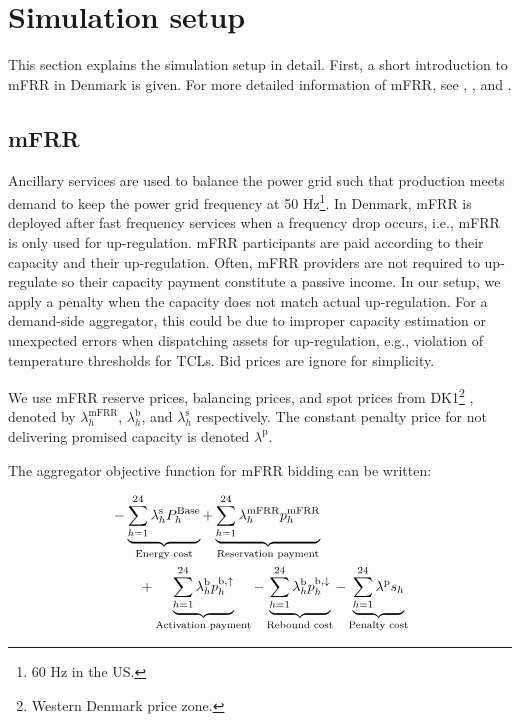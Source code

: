 \documentclass[lettersize,journal]{IEEEtran}
\begin{document}
\section{Simulation setup}

This section explains the simulation setup in detail. First, a short introduction to mFRR in Denmark is given. For more detailed information of mFRR, see \cite{energinet:Systemydelser}, \cite{energinet:prequalification}, and \cite{energinet:tender_conditions_reserves}.

\subsection{mFRR}\label{sec:mFRR}

Ancillary services are used to balance the power grid such that production meets demand to keep the power grid frequency at 50 Hz\footnote{60 Hz in the US.}. In Denmark, mFRR is deployed after fast frequency services when a frequency drop occurs, i.e., mFRR is only used for up-regulation. mFRR participants are paid according to their capacity and their up-regulation. Often, mFRR providers are not required to up-regulate so their capacity payment constitute a passive income. In our setup, we apply a penalty when the capacity does not match actual up-regulation. For a demand-side aggregator, this could be due to improper capacity estimation or unexpected errors when dispatching assets for up-regulation, e.g., violation of temperature thresholds for TCLs. Bid prices are ignore for simplicity.

We use mFRR reserve prices, balancing prices, and spot prices from DK1\footnote{Western Denmark price zone.} \cite{energinet:energidataservice}, denoted by $\lambda_{h}^{\text{mFRR}}$, $\lambda_{h}^{\text{b}}$, and $\lambda_{h}^{\text{s}}$ respectively. The constant penalty price for not delivering promised capacity is denoted $\lambda^{\text{p}}$.

The aggregator objective function for mFRR bidding can be written:

\begin{align}\label{eq:mFRRObjective}
     & - \underbrace{\sum_{h=1}^{24} \lambda^{\text{s}}_{h}P^{\text{Base}}_{h}}_{\textrm{Energy cost}} + \underbrace{\sum_{h=1}^{24}\lambda_{h}^{\text{mFRR}} p^{\text{mFRR}}_{h}}_{\textrm{Reservation payment}}  \notag \\ & \quad \quad + \underbrace{\sum_{h=1}^{24}  \lambda_{h}^{\text{b}} p^{\text{b},\uparrow}_{h}}_{\textrm{Activation payment}} - \underbrace{\sum_{h=1}^{24}  \lambda_{h}^{\text{b}} p^{\text{b},\downarrow}_{h}}_{\textrm{Rebound cost}} - \underbrace{ \sum_{h=1}^{24}  \lambda^{\text{p}}s_{h}}_{\textrm{Penalty cost}}
\end{align}
\end{document}
